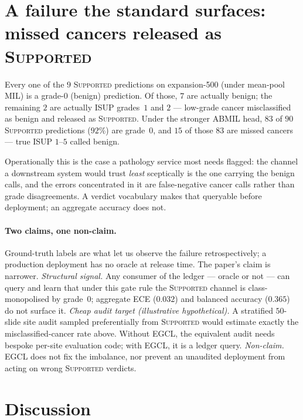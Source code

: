 \documentclass{article}
\newcommand{\SafeNum}[1]{#1}
\begin{document}
\section{A failure the standard surfaces: missed cancers released as \textsc{Supported}}
\label{sec:safety}

Every one of the $\SafeNum{9}$ \textsc{Supported} predictions on expansion-500 (under mean-pool MIL) is a grade-$\SafeNum{0}$ (benign) prediction. Of those, $\SafeNum{7}$ are actually benign; the remaining $\SafeNum{2}$ are actually ISUP grades~$\SafeNum{1}$ and $\SafeNum{2}$ --- low-grade cancer misclassified as benign and released as \textsc{Supported}. Under the stronger ABMIL head, $\SafeNum{83}$ of $\SafeNum{90}$ \textsc{Supported} predictions ($\SafeNum{92}\%$) are grade~$\SafeNum{0}$, and $\SafeNum{15}$ of those $\SafeNum{83}$ are missed cancers --- true ISUP $\SafeNum{1}$--$\SafeNum{5}$ called benign.

Operationally this is the case a pathology service most needs flagged: the channel a downstream system would trust \emph{least} sceptically is the one carrying the benign calls, and the errors concentrated in it are false-negative cancer calls rather than grade disagreements. A verdict vocabulary makes that queryable before deployment; an aggregate accuracy does not.

\paragraph{Two claims, one non-claim.} Ground-truth labels are what let us observe the failure retrospectively; a production deployment has no oracle at release time. The paper's claim is narrower.
\emph{Structural signal.} Any consumer of the ledger --- oracle or not --- can query and learn that under this gate rule the \textsc{Supported} channel is class-monopolised by grade~$\SafeNum{0}$; aggregate ECE ($\SafeNum{0.032}$) and balanced accuracy ($\SafeNum{0.365}$) do not surface it.
\emph{Cheap audit target (illustrative hypothetical).} A stratified $\SafeNum{50}$-slide site audit sampled preferentially from \textsc{Supported} would estimate exactly the misclassified-cancer rate above. Without EGCL, the equivalent audit needs bespoke per-site evaluation code; with EGCL, it is a ledger query.
\emph{Non-claim.} EGCL does not fix the imbalance, nor prevent an unaudited deployment from acting on wrong \textsc{Supported} verdicts.

\section{Discussion}
\label{sec:discussion}
\end{document}
